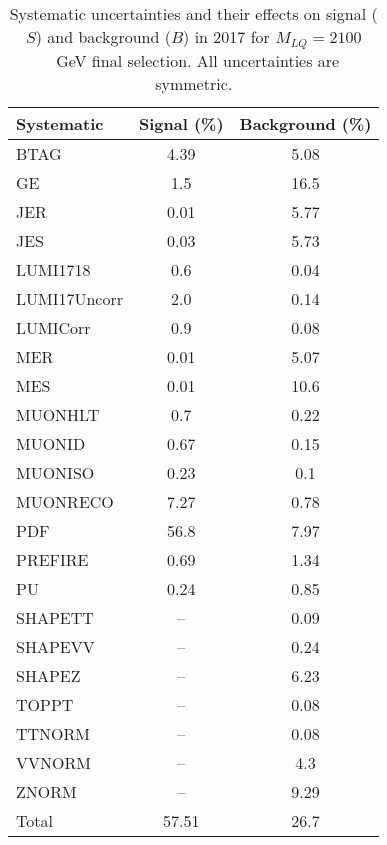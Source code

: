 \begin{table}[htbp]
\begin{center}
\caption{Systematic uncertainties and their effects on signal ($S$) and background ($B$) in 2017 for $M_{LQ}=2100$~GeV final selection. All uncertainties are symmetric.}
\begin{tabular}{lcc}
\hline\hline
Systematic & Signal (\%) & Background (\%) \\ \hline 
BTAG & 4.39 & 5.08\\ 
GE & 1.5 & 16.5\\ 
JER & 0.01 & 5.77\\ 
JES & 0.03 & 5.73\\ 
LUMI1718 & 0.6 & 0.04\\ 
LUMI17Uncorr & 2.0 & 0.14\\ 
LUMICorr & 0.9 & 0.08\\ 
MER & 0.01 & 5.07\\ 
MES & 0.01 & 10.6\\ 
MUONHLT & 0.7 & 0.22\\ 
MUONID & 0.67 & 0.15\\ 
MUONISO & 0.23 & 0.1\\ 
MUONRECO & 7.27 & 0.78\\ 
PDF & 56.8 & 7.97\\ 
PREFIRE & 0.69 & 1.34\\ 
PU & 0.24 & 0.85\\ 
SHAPETT & -- & 0.09\\ 
SHAPEVV & -- & 0.24\\ 
SHAPEZ & -- & 6.23\\ 
TOPPT & -- & 0.08\\ 
TTNORM & -- & 0.08\\ 
VVNORM & -- & 4.3\\ 
ZNORM & -- & 9.29\\ 
Total & 57.51 & 26.7\\ \hline \hline
\end{tabular}
\label{tab:SysUncertainties_uujj_2100}
\end{center}
\end{table}

